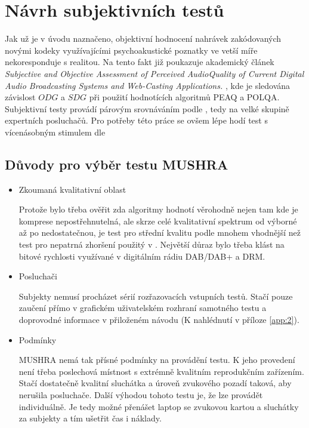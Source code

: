 \section{Návrh subjektivních testů}

Jak už je v úvodu naznačeno, objektivní hodnocení nahrávek zakódovaných novými kodeky využívajícími psychoakustické poznatky ve vetší míře nekoresponduje s realitou. Na tento fakt již poukazuje akademický článek \textit{Subjective and Objective Assessment of Perceived AudioQuality of Current Digital Audio Broadcasting Systems and Web-Casting Applications.} \cite{article:pocta}, kde je sledována závislost $ODG$ a $SDG$ při použití hodnotících algoritmů PEAQ a POLQA. Subjektivní testy provádí párovým srovnáváním podle \cite{itur:1116}, tedy na velké skupině expertních posluchačů. Pro potřeby této práce se ovšem lépe hodí test s vícenásobným stimulem dle \cite{itur:1534}

\subsection{Důvody pro výběr testu MUSHRA}
\begin{itemize}
    \item Zkoumaná kvalitativní oblast
    
    Protože bylo třeba ověřit zda algoritmy hodnotí věrohodně nejen tam kde je komprese nepostřehnutelná, ale skrze celé kvalitativní spektrum od výborné až po nedostatečnou, je test pro střední kvalitu podle \cite{itur:1534} mnohem vhodnější než test pro nepatrná zhoršení použitý v \cite{article:pocta}. Největší důraz bylo třeba klást na bitové rychlosti využívané v digitálním rádiu DAB/DAB+ a DRM.
    
    \item Posluchači

    Subjekty nemusí procházet sérií rozřazovacích vstupních testů. Stačí pouze zaučení přímo v grafickém uživatelském rozhraní samotného testu a doprovodné informace v přiloženém návodu (K nahlédnutí v příloze \ref{app:2}).
    
    \item Podmínky
    
    MUSHRA nemá tak přísné podmínky na provádění testu. K jeho provedení není třeba poslechová místnost s extrémně kvalitním reprodukčním zařízením. Stačí dostatečně kvalitní sluchátka a úroveň zvukového pozadí taková, aby nerušila posluchače.
    Další výhodou tohoto testu je, že lze provádět individuálně. Je tedy možné přenášet laptop se zvukovou kartou a sluchátky za subjekty a tím ušetřit čas i náklady.
\end{itemize}

